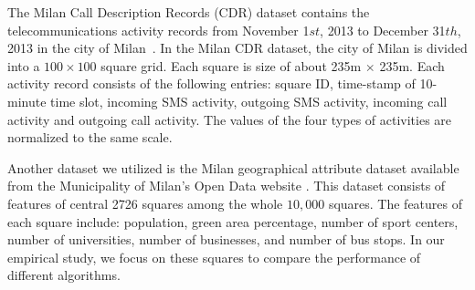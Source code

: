 The Milan Call Description Records (CDR) dataset
contains the telecommunications activity records from November 1$st$, 2013 to December 31$th$, 2013 in the city of Milan~\cite{bigdatachallenge}. In the Milan CDR dataset, the city of Milan is divided into a $100\times 100$ square grid. Each square is size of about 235m $\times$ 235m. Each activity record consists of the following entries: square ID, time-stamp of 10-minute time slot, incoming SMS activity, outgoing SMS activity, incoming call activity and outgoing call activity. The values of the four types of activities are normalized to the same scale.





Another dataset we utilized is the Milan geographical attribute dataset available from the Municipality of Milan's Open Data website \cite{barlacchi2015multi}. This dataset consists of features of central 2726 squares among the whole $10,000$ squares. The features of each square include: population, green area percentage, number of sport centers, number of universities, number of businesses, and number of bus stops.
In our empirical study, we focus on these squares to compare the performance of different algorithms.




